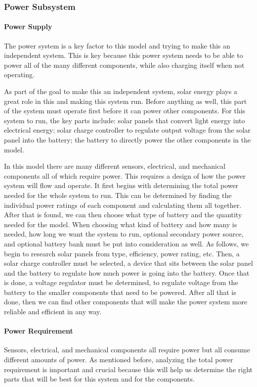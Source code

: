 \subsubsection{Power Subsystem}
\paragraph{Power Supply}
The power system is a key factor to this model and trying to make this an independent system. This is key because this power system needs to be able to power all of the many different components, while also charging itself when not operating.

As part of the goal to make this an independent system, solar energy plays a great role in this and making this system run. Before anything as well, this part of the system must operate first before it can power other components. For this system to run, the key parts include: solar panels that convert light energy into electrical energy; solar charge controller to regulate output voltage from the solar panel into the battery; the battery to directly power the other components in the model.

In this model there are many different sensors, electrical, and mechanical components all of which require power. This requires a design of how the power system will flow and operate. It first begins with determining the total power needed for the whole system to run. This can be determined by finding the individual power ratings of each component and calculating them all together. After that is found, we can then choose what type of battery and the quantity needed for the model. When choosing what kind of battery and how many is needed, how long we want the system to run, optional secondary power source, and optional battery bank must be put into consideration as well. As follows, we begin to research solar panels from type, efficiency, power rating, etc. Then, a solar charge controller must be selected, a device that sits between the solar panel and the battery to regulate how much power is going into the battery. Once that is done, a voltage regulator must be determined, to regulate voltage from the battery to the smaller components that need to be powered. After all that is done, then we can find other components that will make the power system more reliable and efficient in any way.

\paragraph{Power Requirement}
Sensors, electrical, and mechanical components all require power but all consume different amounts of power. As mentioned before, analyzing the total power requirement is important and crucial because this will help us determine the right parts that will be best for this system and for the components.

